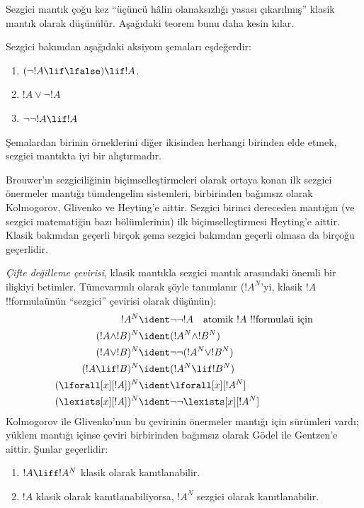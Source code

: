 Sezgici mantık çoğu kez ``üçüncü hâlin olanaksızlığı yasası çıkarılmış'' klasik
mantık olarak düşünülür. Aşağıdaki teorem bunu daha kesin kılar.
\begin{thm}
Sezgici bakımdan aşağıdaki aksiyom şemaları eşdeğerdir:
\begin{enumerate}
\item $(\lnot !A \lif \lfalse) \lif !A$.
\item $!A \lor \lnot !A$
\item $\lnot \lnot !A \lif !A$
\end{enumerate}
\end{thm}
Şemalardan birinin örneklerini diğer ikisinden herhangi birinden elde etmek,
sezgici mantıkta iyi bir alıştırmadır.

Brouwer'ın sezgiciliğinin biçimselleştirmeleri olarak ortaya konan ilk sezgici
önermeler mantığı tümdengelim sistemleri, birbirinden bağımsız olarak
Kolmogorov, Glivenko ve Heyting'e aittir. Sezgici birinci dereceden mantığın
(ve sezgici matematiğin bazı bölümlerinin) ilk biçimselleştirmesi Heyting'e
aittir. Klasik bakımdan geçerli birçok şema sezgici bakımdan geçerli olmasa da
birçoğu geçerlidir.

\emph{Çifte değilleme çevirisi}, klasik mantıkla sezgici mantık arasındaki
önemli bir ilişkiyi betimler. Tümevarımlı olarak şöyle tanımlanır ($!A^N$'yi,
klasik $!A$ !!{formula}{}ünün ``sezgici'' çevirisi olarak düşünün):
\begin{align*}
!A^N & \ident \lnot\lnot !A \quad \text{atomik $!A$ !!{formula}{}ü için} \\
(!A \land !B)^N & \ident (!A^N \land !B^N) \\
(!A \lor !B)^N & \ident  \lnot\lnot (!A^N \lor !B^N) \\
(!A \lif !B)^N & \ident (!A^N \lif !B^N) \\
(\lforall[x][!A])^N & \ident \lforall[x][!A^N] \\
(\lexists[x][!A])^N & \ident \lnot\lnot\lexists[x][!A^N]
\end{align*}
Kolmogorov ile Glivenko'nun bu çevirinin önermeler mantığı için sürümleri
vardı; yüklem mantığı içinse çeviri birbirinden bağımsız olarak G\"odel ile
Gentzen'e aittir. Şunlar geçerlidir:

\begin{thm}
\begin{enumerate}
\item $!A \liff !A^N$ klasik olarak kanıtlanabilir.
\item $!A$ klasik olarak kanıtlanabiliyorsa, $!A^N$ sezgici olarak
  kanıtlanabilir.
\end{enumerate}
\end{thm}

